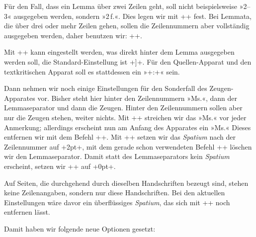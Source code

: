 Für den Fall, dass ein Lemma über zwei Zeilen geht, soll nicht beispielsweise »2--3« 
ausgegeben werden, sondern »2\,f.«. Dies legen wir mit ++ 
fest. Bei Lemmata, die über drei oder mehr Zeilen gehen, sollen die Zeilennummern 
aber vollständig ausgegeben werden, daher benutzen wir: +\Xtwolinesbutnotmore[<app>]+.

Mit ++ kann eingestellt werden, was direkt hinter dem 
Lemma ausgegeben werden soll, die Standard-Einstellung ist +]+. Für den Quellen-Apparat 
und den textkritischen Apparat soll es stattdessen ein »+:+« sein.


Dann nehmen wir noch einige Einstellungen für den Sonderfall des Zeugen-Apparates vor. Bisher 
steht hier hinter den Zeilennummern »Ms.«, dann der Lemma\-sepa\-rator und dann die 
Zeugen. Hinter den Zeilennummern sollen aber nur die Zeugen stehen, weiter nichts. 
Mit ++ streichen wir das »Ms.« vor jeder Anmerkung; 
allerdings erscheint nun am Anfang des Apparates ein »Ms.« Dieses entfernen 
wir mit dem Befehl ++. Mit ++ 
setzen wir das \emph{Spatium} nach der Zeilennummer auf +2pt+, mit dem gerade 
schon verwendeten Befehl +\Xlemmaseparator+ löschen wir den Lemmaseparator. 
Damit statt des Lemmaseparators kein \emph{Spatium} erscheint, setzen wir 
++ auf +0pt+.

Auf Seiten, die durchgehend durch dieselben Handschriften bezeugt sind, stehen keine Zeilenangaben, sondern nur diese Handschriften. Bei den aktuellen Einstellungen wäre davor ein überflüssiges \emph{Spatium}, 
das sich mit ++ noch entfernen lässt.

Damit haben wir folgende neue Optionen gesetzt:

\begin{lfgwcode}{}
%
\Xnumberonlyfirstinline[][true]%
\Xnumberonlyfirstintwolines[][true]%
\Xsymlinenum{||}%
\Xnotenumfont[]{\bfseries}%
\Xnonbreakableafternumber[]%
%
\Xtwolinesbutnotmore%

\Xlemmaseparator[B,C]{:}

\setmsdatalabel{}%
\Xtxtbeforenotes[A]{}%
\Xafternumber[A]{2pt}%
\Xlemmaseparator[A]{}%
\Xinplaceoflemmaseparator[A]{0pt}%
\Xinplaceofnumber[A]{0pt}%
\end{lfgwcode}

